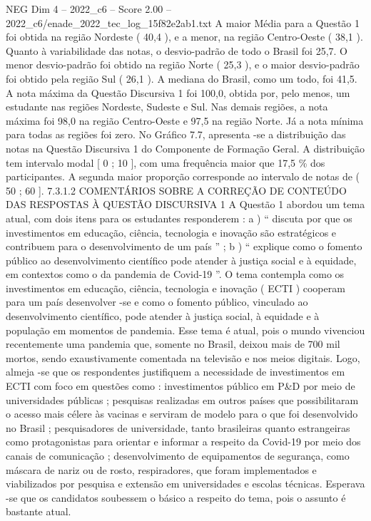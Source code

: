 \begin{textsample}{NEG Dim 4 – 2022\_c6 – Score 2.00 – 2022\_c6/enade\_2022\_tec\_log\_15f82e2ab1.txt}
A maior Média para a Questão 1 foi obtida na região Nordeste ( 40,4 ), e a menor, na região Centro-Oeste ( 38,1 ).
Quanto à variabilidade das notas, o desvio-padrão de todo o Brasil foi 25,7.
O menor desvio-padrão foi obtido na região Norte ( 25,3 ), e o maior desvio-padrão foi obtido pela região Sul ( 26,1 ).
A mediana do Brasil, como um todo, foi 41,5.
A nota máxima da Questão Discursiva 1 foi 100,0, obtida por, pelo menos, um estudante nas regiões Nordeste, Sudeste e Sul.
Nas demais regiões, a nota máxima foi 98,0 na região Centro-Oeste e 97,5 na região Norte.
Já a nota mínima para todas as regiões foi zero.
No Gráfico 7.7, apresenta -se a distribuição das notas na Questão Discursiva 1 do Componente de Formação Geral.
A distribuição tem intervalo modal [ 0 ; 10 ], com uma frequência maior que 17,5 \% dos participantes.
A segunda maior proporção corresponde ao intervalo de notas de ( 50 ; 60 ]. 7.3.1.2 COMENTÁRIOS SOBRE A CORREÇÃO DE CONTEÚDO DAS RESPOSTAS À QUESTÃO DISCURSIVA 1 A Questão 1 abordou um tema atual, com dois itens para os estudantes responderem : a ) “ discuta por que os investimentos em educação, ciência, tecnologia e inovação são estratégicos e contribuem para o desenvolvimento de um país ” ; b ) “ explique como o fomento público ao desenvolvimento científico pode atender à justiça social e à equidade, em contextos como o da pandemia de Covid-19 ”.
O tema contempla como os investimentos em educação, ciência, tecnologia e inovação ( ECTI ) cooperam para um país desenvolver -se e como o fomento público, vinculado ao desenvolvimento científico, pode atender à justiça social, à equidade e à população em momentos de pandemia.
Esse tema é atual, pois o mundo vivenciou recentemente uma pandemia que, somente no Brasil, deixou mais de 700 mil mortos, sendo exaustivamente comentada na televisão e nos meios digitais.
Logo, almeja -se que os respondentes justifiquem a necessidade de investimentos em ECTI com foco em questões como : investimentos público em P\&D por meio de universidades públicas ; pesquisas realizadas em outros países que possibilitaram o acesso mais célere às vacinas e serviram de modelo para o que foi desenvolvido no Brasil ; pesquisadores de universidade, tanto brasileiras quanto estrangeiras como protagonistas para orientar e informar a respeito da Covid-19 por meio dos canais de comunicação ; desenvolvimento de equipamentos de segurança, como máscara de nariz ou de rosto, respiradores, que foram implementados e viabilizados por pesquisa e extensão em universidades e escolas técnicas.
Esperava -se que os candidatos soubessem o básico a respeito do tema, pois o assunto é bastante atual.

\end{textsample}
